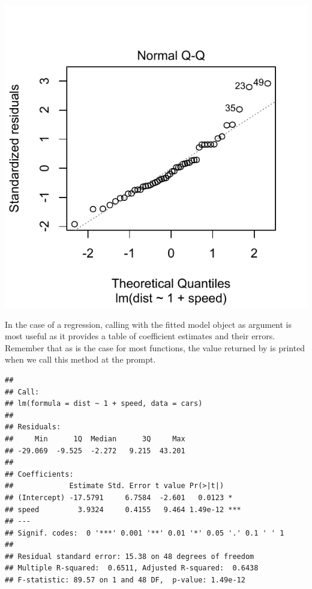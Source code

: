 \documentclass[krantz2]{krantz}\usepackage{knitr}
\begin{document}
\begin{knitrout}\footnotesize
{}\color{fgcolor}\begin{kframe}
\begin{alltt}
  \hlstd{=} \hlstd{)}
\end{alltt}
\end{kframe}

{\centering \includegraphics[width=.54\textwidth]{figure/pos-models-1a-1} 

}


\end{knitrout}

In the case of a regression, calling  with the fitted model object as argument is most useful as it provides a table of coefficient estimates and their errors. Remember that as is the case for most \Rlang functions, the value returned by  is printed when we call this method at the \Rlang prompt.

\begin{knitrout}\footnotesize
{}\color{fgcolor}\begin{kframe}
\begin{alltt}
\end{alltt}
\begin{verbatim}
## 
## Call:
## lm(formula = dist ~ 1 + speed, data = cars)
## 
## Residuals:
##     Min      1Q  Median      3Q     Max 
## -29.069  -9.525  -2.272   9.215  43.201 
## 
## Coefficients:
##             Estimate Std. Error t value Pr(>|t|)    
## (Intercept) -17.5791     6.7584  -2.601   0.0123 *  
## speed         3.9324     0.4155   9.464 1.49e-12 ***
## ---
## Signif. codes:  0 '***' 0.001 '**' 0.01 '*' 0.05 '.' 0.1 ' ' 1
## 
## Residual standard error: 15.38 on 48 degrees of freedom
## Multiple R-squared:  0.6511,	Adjusted R-squared:  0.6438 
## F-statistic: 89.57 on 1 and 48 DF,  p-value: 1.49e-12
\end{verbatim}
\end{kframe}
\end{knitrout}
\end{document}
